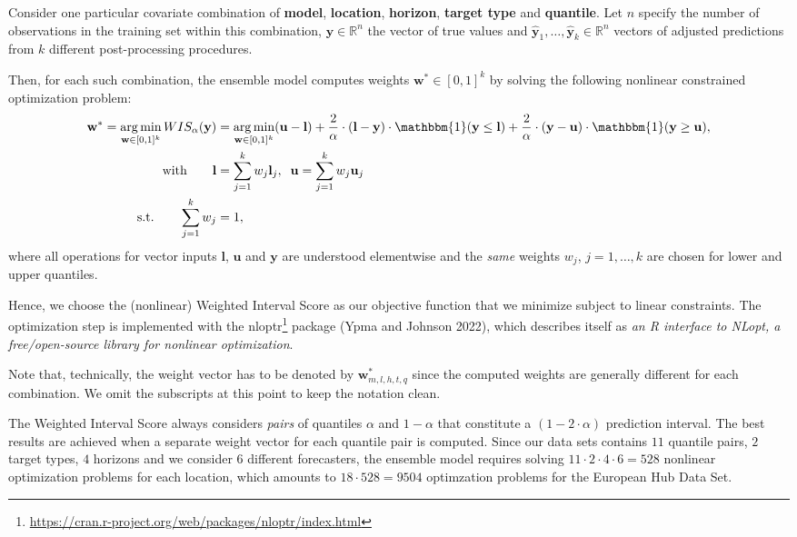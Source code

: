 \documentclass[
]{article}
\DeclareRobustCommand{\href}[2]{#2\footnote{\url{#1}}}
\begin{document}
Consider one particular covariate combination of \textbf{model}, \textbf{location}, \textbf{horizon}, \textbf{target type} and \textbf{quantile}.
Let \(n\) specify the number of observations in the training set within this combination, \(\mathbf{y} \in \mathbb{R}^n\) the vector of true values and \(\hat{\mathbf{y}}_1, \ldots, \hat{\mathbf{y}}_k \in \mathbb{R}^n\) vectors of adjusted predictions from \(k\) different post-processing procedures.

Then, for each such combination, the ensemble model computes weights \(\mathbf{w}^* \in [0, 1]^k\) by solving the following nonlinear constrained optimization problem:
\[
\begin{aligned}
\mathbf{w}^*
= \operatorname*{arg\,min}_{ \mathbf{w} \in [0, 1]^k} WIS_\alpha(\mathbf{y})
&= \operatorname*{arg\,min}_{ \mathbf{w} \in [0, 1]^k} (\mathbf{u}-\mathbf{l}) + \frac{2}{\alpha} \cdot (\mathbf{l}-\mathbf{y}) \cdot \mathbbm{1} (\mathbf{y} \leq \mathbf{l}) + \frac{2}{\alpha} \cdot (\mathbf{y}-\mathbf{u}) \cdot \mathbbm{1}(\mathbf{y} \geq \mathbf{u}), \\
\text{with} \qquad \mathbf{l} &= \sum_{j=1}^{k} w_j \mathbf{l}_j, \;\; \mathbf{u} = \sum_{j=1}^{k} w_j \mathbf{u}_j \\
\text{s.t.} \qquad \sum_{j=1}^{k} w_j &= 1,
\end{aligned}
\]
where all operations for vector inputs \(\mathbf{l}\), \(\mathbf{u}\) and \(\mathbf{y}\) are understood elementwise and the \emph{same} weights \(w_j\), \(j = 1, \ldots, k\) are chosen for lower and upper quantiles.

Hence, we choose the (nonlinear) Weighted Interval Score as our objective function that we minimize subject to linear constraints.
The optimization step is implemented with the \href{https://cran.r-project.org/web/packages/nloptr/index.html}{nloptr} package (Ypma and Johnson 2022), which describes itself as \emph{an R interface to NLopt, a free/open-source library for nonlinear optimization}.

Note that, technically, the weight vector has to be denoted by \(\mathbf{w}_{m, l, h, t, q}^*\) since the computed weights are generally different for each combination.
We omit the subscripts at this point to keep the notation clean.

The Weighted Interval Score always considers \emph{pairs} of quantiles \(\alpha\) and \(1 - \alpha\) that constitute a \((1 - 2 \cdot \alpha)\) prediction interval.
The best results are achieved when a separate weight vector for each quantile pair is computed.
Since our data sets contains \(11\) quantile pairs, \(2\) target types, \(4\) horizons and we consider \(6\) different forecasters, the ensemble model requires solving \(11 \cdot 2 \cdot 4 \cdot 6 = 528\) nonlinear optimization problems for each location, which amounts to \(18 \cdot 528 = 9504\) optimzation problems for the European Hub Data Set.
\end{document}
